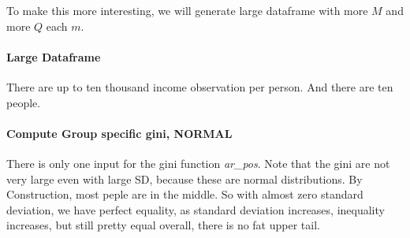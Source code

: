 \documentclass[
]{book}
\newenvironment{Shaded}{\begin{snugshade}}{\end{snugshade}}
\newcommand{\CommentTok}[1]{\textcolor[rgb]{0.56,0.35,0.01}{\textit{#1}}}
\newcommand{\DataTypeTok}[1]{\textcolor[rgb]{0.13,0.29,0.53}{#1}}
\newcommand{\DecValTok}[1]{\textcolor[rgb]{0.00,0.00,0.81}{#1}}
\newcommand{\FloatTok}[1]{\textcolor[rgb]{0.00,0.00,0.81}{#1}}
\newcommand{\KeywordTok}[1]{\textcolor[rgb]{0.13,0.29,0.53}{\textbf{#1}}}
\newcommand{\NormalTok}[1]{#1}
\newcommand{\OperatorTok}[1]{\textcolor[rgb]{0.81,0.36,0.00}{\textbf{#1}}}
\newcommand{\OtherTok}[1]{\textcolor[rgb]{0.56,0.35,0.01}{#1}}
\newcommand{\StringTok}[1]{\textcolor[rgb]{0.31,0.60,0.02}{#1}}
\begin{document}
To make this more interesting, we will generate large dataframe with more \(M\) and more \(Q\) each \(m\).

\hypertarget{large-dataframe}{%
\paragraph{Large Dataframe}\label{large-dataframe}}

There are up to ten thousand income observation per person. And there are ten people.

\begin{Shaded}
\end{Shaded}

\hypertarget{compute-group-specific-gini-normal}{%
\paragraph{Compute Group specific gini, NORMAL}\label{compute-group-specific-gini-normal}}

There is only one input for the gini function \emph{ar\_pos}. Note that the gini are not very large even with large SD, because these are normal distributions. By Construction, most peple are in the middle. So with almost zero standard deviation, we have perfect equality, as standard deviation increases, inequality increases, but still pretty equal overall, there is no fat upper tail.
\end{document}
